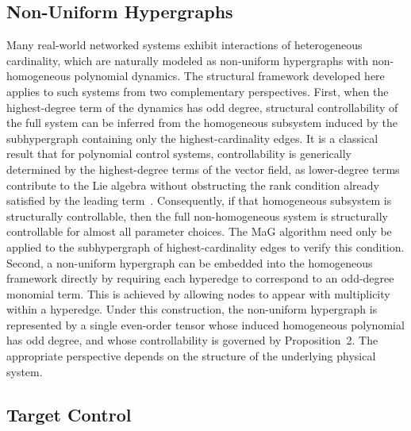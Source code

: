 \documentclass[journal,twoside,web]{ieeecolor}
\begin{document}
\subsection{Non-Uniform Hypergraphs}
Many real-world networked systems exhibit interactions of heterogeneous cardinality, which are naturally modeled as non-uniform hypergraphs with non-homogeneous polynomial dynamics. The structural framework developed here applies to such systems from two complementary perspectives.
First, when the highest-degree term of the dynamics has odd degree, structural controllability of the full system can be inferred from the homogeneous subsystem induced by the subhypergraph containing only the highest-cardinality edges. It is a classical result that for polynomial control systems, controllability is generically determined by the highest-degree terms of the vector field, as lower-degree terms contribute to the Lie algebra without obstructing the rank condition already satisfied by the leading term~\cite{jurdjevic1985polynomial}. Consequently, if that homogeneous subsystem is structurally controllable, then the full non-homogeneous system is structurally controllable for almost all parameter choices. The MaG algorithm need only be applied to the subhypergraph of highest-cardinality edges to verify this condition.
Second, a non-uniform hypergraph can be embedded into the homogeneous framework directly by requiring each hyperedge to correspond to an odd-degree monomial term.
This is achieved by allowing nodes to appear with multiplicity within a hyperedge. Under this construction, the non-uniform hypergraph is represented by a single even-order tensor whose induced homogeneous polynomial has odd degree, and whose controllability is governed by Proposition~2. The appropriate perspective depends on the structure of the underlying physical system.



\subsection{Target Control}
\end{document}
